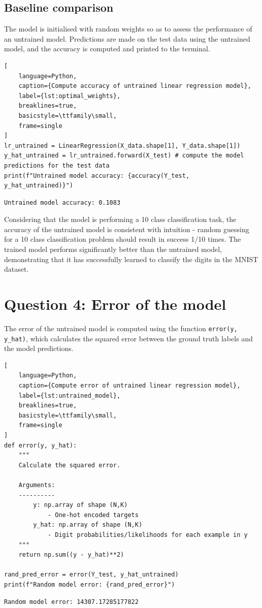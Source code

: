 \documentclass[11pt]{article}
\begin{document}
\subsection{Baseline comparison}
The model is initialised with random weights so as to assess the performance of an untrained model. Predictions are made on the test data using the untrained model, and the accuracy is computed and printed to the terminal.
\begin{lstlisting}[
    language=Python, 
    caption={Compute accuracy of untrained linear regression model},
    label={lst:optimal_weights},
    breaklines=true,
    basicstyle=\ttfamily\small,
    frame=single
]
lr_untrained = LinearRegression(X_data.shape[1], Y_data.shape[1])
y_hat_untrained = lr_untrained.forward(X_test) # compute the model predictions for the test data
print(f"Untrained model accuracy: {accuracy(Y_test, y_hat_untrained)}")
\end{lstlisting}
\begin{lstlisting}[style=terminal, caption={Code execution output}]
Untrained model accuracy: 0.1083
\end{lstlisting}
Considering that the model is performing a 10 class classification task, the accuracy of the untrained model is consistent with intuition
- random guessing for a 10 class classification problem should result in success 1/10 times. The trained model performs significantly better 
than the untrained model, demonstrating that it has successfully learned to classify the digits in the MNIST dataset.

\section{Question 4: Error of the model}
The error of the untrained model is computed using the function \texttt{error(y, y\_hat)}, which calculates the squared error between the ground truth labels and the model predictions.
\begin{lstlisting}[
    language=Python, 
    caption={Compute error of untrained linear regression model},
    label={lst:untrained_model},
    breaklines=true,
    basicstyle=\ttfamily\small,
    frame=single
]
def error(y, y_hat):
    """
    Calculate the squared error.

    Arguments:
    ----------
        y: np.array of shape (N,K)
            - One-hot encoded targets
        y_hat: np.array of shape (N,K)
            - Digit probabilities/likelihoods for each example in y
    """
    return np.sum((y - y_hat)**2)

rand_pred_error = error(Y_test, y_hat_untrained)
print(f"Random model error: {rand_pred_error}")
\end{lstlisting}
\begin{lstlisting}[style=terminal, caption={Code execution output}]
Random model error: 14307.17285177822
\end{lstlisting}
\end{document}
